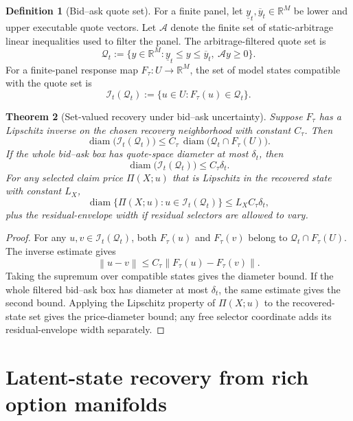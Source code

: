 \documentclass[11pt,a4paper]{amsart}
\theoremstyle{plain}
\newtheorem{theorem}{Theorem}[section]
\theoremstyle{definition}
\newtheorem{definition}[theorem]{Definition}
\theoremstyle{remark}
\newcommand{\R}{\mathbb{R}}
\newcommand{\cA}{\mathcal{A}}
\newcommand{\cI}{\mathcal{I}}
\newcommand{\cQ}{\mathcal{Q}}
\newcommand{\norm}[1]{\left\lVert #1\right\rVert}
\begin{document}
\begin{definition}[Bid--ask quote set]\label{def:bid-ask-quote-set}
For a finite panel, let \(\underline y_t,\overline y_t\in\R^M\) be lower and upper executable
quote vectors.  Let \(\cA\) denote the finite set of static-arbitrage linear inequalities used
to filter the panel.  The arbitrage-filtered quote set is
\[
        \cQ_t
        :=
        \{y\in\R^M:\underline y_t\le y\le\overline y_t,\ \cA y\ge0\}.
\]
For a finite-panel response map \(F_\tau:U\to\R^M\), the set of model states compatible with the
quote set is
\[
        \cI_t(\cQ_t):=\{u\in U:F_\tau(u)\in\cQ_t\}.
\]
\end{definition}

\begin{theorem}[Set-valued recovery under bid--ask uncertainty]\label{thm:set-valued-recovery}
Suppose \(F_\tau\) has a Lipschitz inverse on the chosen recovery neighborhood with constant
\(C_\tau\).  Then
\[
        \operatorname{diam}\bigl(\cI_t(\cQ_t)\bigr)
        \le
        C_\tau\,\operatorname{diam}\bigl(\cQ_t\cap F_\tau(U)\bigr).
\]
If the whole bid--ask box has quote-space diameter at most \(\delta_t\), then
\[
        \operatorname{diam}\bigl(\cI_t(\cQ_t)\bigr)
        \le C_\tau\delta_t .
\]
For any selected claim price \(\Pi(X;u)\) that is Lipschitz in the recovered state with constant
\(L_X\),
\[
        \operatorname{diam}\{\Pi(X;u):u\in\cI_t(\cQ_t)\}
        \le L_XC_\tau\delta_t,
\]
plus the residual-envelope width if residual selectors are allowed to vary.
\end{theorem}

\begin{proof}
For any \(u,v\in\cI_t(\cQ_t)\), both \(F_\tau(u)\) and \(F_\tau(v)\) belong to
\(\cQ_t\cap F_\tau(U)\).  The inverse estimate gives
\[
        \norm{u-v}\le C_\tau\norm{F_\tau(u)-F_\tau(v)}.
\]
Taking the supremum over compatible states gives the diameter bound.  If the whole filtered
bid--ask box has diameter at most \(\delta_t\), the same estimate gives the second bound.  Applying
the Lipschitz property of \(\Pi(X;u)\) to the recovered-state set gives the price-diameter bound;
any free selector coordinate adds its residual-envelope width separately.
\end{proof}

\section{Latent-state recovery from rich option manifolds}\label{sec:recovery}
\end{document}
